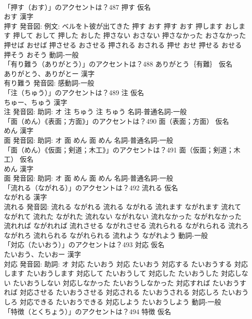 \documentclass[8pt]{extreport}
\begin{document}
\begin{CJK}{UTF8}{min}
\\	「押す（おす）」のアクセントは？487	押す 仮名　
\\	おす 漢字　
\\	押す 発音図: 例文: ベルをト彼が出てきた	押す おす		押す おす 押します おします 押して おして 押した おした 押さない おさない 押さなかった おさなかった 押せば おせば 押させる おさせる 押される おされる 押せ おせ 押せる おせる 押そう おそう				動詞-一般 
\\	「有り難う（ありがとう）」のアクセントは？488	ありがとう｛有難｝ 仮名　
\\	ありがとう、ありがとー 漢字　
\\	有り難う 発音図:							感動詞-一般 
\\	「注（ちゅう）」のアクセントは？489	注 仮名　
\\	ちゅー、ちゅう 漢字　
\\	注 発音図: 助詞: オ	注 ちゅう		注 ちゅう				名詞-普通名詞-一般 
\\	「面（めん）《表面；方面》」のアクセントは？490	面（表面；方面） 仮名　
\\	めん 漢字　
\\	面 発音図: 助詞: オ	面 めん		面 めん				名詞-普通名詞-一般 
\\	「面（めん）《仮面；剣道；木工》」のアクセントは？491	面（仮面；剣道；木工） 仮名　
\\	めん 漢字　
\\	面 発音図: 助詞: オ	面 めん		面 めん				名詞-普通名詞-一般 
\\	「流れる（ながれる）」のアクセントは？492	流れる 仮名　
\\	ながれる 漢字　
\\	流れる 発音図:	流れる ながれる		流れる ながれる 流れます ながれます 流れて ながれて 流れた ながれた 流れない ながれない 流れなかった ながれなかった 流れれば ながれれば 流れさせる ながれさせる 流れられる ながれられる 流れろ ながれろ 流れられる ながれられる 流れよう ながれよう				動詞-一般 
\\	「対応（たいおう）」のアクセントは？493	対応 仮名　
\\	たいおう、たいおー 漢字　
\\	対応 発音図: 助詞: オ	対応 たいおう		対応 たいおう 対応する たいおうする 対応します たいおうします 対応して たいおうして 対応した たいおうした 対応しない たいおうしない 対応しなかった たいおうしなかった 対応すれば たいおうすれば 対応させる たいおうさせる 対応される たいおうされる 対応しろ たいおうしろ 対応できる たいおうできる 対応しよう たいおうしよう				動詞-一般 
\\	「特徴（とくちょう）」のアクセントは？494	特徴 仮名　

\end{CJK}
\end{document}

